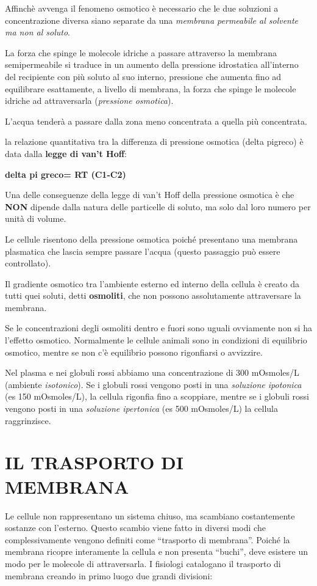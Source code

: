 \documentclass[]{article}
\begin{document}
Affinchè avvenga il fenomeno osmotico è necessario che le due soluzioni
a concentrazione diversa siano separate da una \emph{membrana permeabile
al solvente ma non al soluto}.

La forza che spinge le molecole idriche a passare attraverso la membrana
semipermeabile si traduce in un aumento della pressione idrostatica
all'interno del recipiente con più soluto al suo interno, pressione che
aumenta fino ad equilibrare esattamente, a livello di membrana, la forza
che spinge le molecole idriche ad attraversarla (\emph{pressione
osmotica}).

L'acqua tenderà a passare dalla zona meno concentrata a quella più
concentrata.

la relazione quantitativa tra la differenza di pressione osmotica (delta
pigreco) è data dalla \textbf{legge di van't Hoff}:

\textbf{delta pi greco= RT (C1-C2)}

Una delle conseguenze della legge di van't Hoff della pressione osmotica
è che \textbf{NON} dipende dalla natura delle particelle di soluto, ma
solo dal loro numero per unità di volume.

Le cellule risentono della pressione osmotica poiché presentano una
membrana plasmatica che lascia sempre passare l'acqua (questo passaggio
può essere controllato).

Il gradiente osmotico tra l'ambiente esterno ed interno della cellula è
creato da tutti quei soluti, detti \textbf{osmoliti}, che non possono
assolutamente attraversare la membrana.

Se le concentrazioni degli osmoliti dentro e fuori sono uguali
ovviamente non si ha l'effetto osmotico. Normalmente le cellule animali
sono in condizioni di equilibrio osmotico, mentre se non c'è equilibrio
possono rigonfiarsi o avvizzire.

Nel plasma e nei globuli rossi abbiamo una concentrazione di 300
mOsmoles/L (ambiente \emph{isotonico}). Se i globuli rossi vengono posti
in una \emph{soluzione ipotonica} (es 150 mOsmoles/L), la cellula
rigonfia fino a scoppiare, mentre se i globuli rossi vengono posti in
una \emph{soluzione ipertonica} (es 500 mOsmoles/L) la cellula
raggrinzisce.

\section{IL TRASPORTO DI MEMBRANA}\label{il-trasporto-di-membrana}

Le cellule non rappresentano un sistema chiuso, ma scambiano
costantemente sostanze con l'esterno. Questo scambio viene fatto in
diversi modi che complessivamente vengono definiti come ``trasporto di
membrana''. Poiché la membrana ricopre interamente la cellula e non
presenta ``buchi'', deve esistere un modo per le molecole di
attraversarla. I fisiologi catalogano il trasporto di membrana creando
in primo luogo due grandi divisioni:
\end{document}
